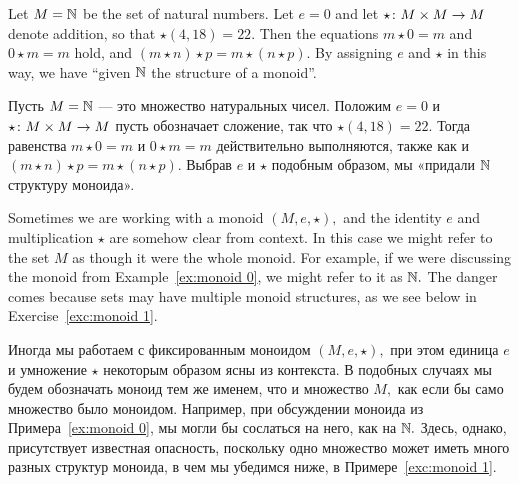 \documentclass[CT4S-EN-RU]{subfiles}
\begin{document}
\begin{exampleENG}\label{ex:monoid 0}
Let $M={\mathbb N}$ be the set of natural numbers. Let $e=0$ and let $\star\colon M\times M\rightarrow M$ denote addition, so that $\star(4,18)=22.$ Then the equations $m\star 0=m$ and $0\star m=m$ hold, and $(m\star n)\star p=m\star (n\star p).$ By assigning $e$ and $\star$ in this way, we have “given ${\mathbb N}$ the structure of a monoid”.
\end{exampleENG}

\begin{exampleRUS}\label{ex:monoid 0}
Пусть $M={\mathbb N}$ — это множество натуральных чисел. Положим $e=0$ и $\star\colon M\times M\rightarrow M$ пусть обозначает сложение, так что $\star(4,18)=22.$ Тогда равенства $m\star 0=m$ и $0\star m=m$ действительно выполняются, также как и $(m\star n)\star p=m\star (n\star p).$ Выбрав $e$ и $\star$ подобным образом, мы «придали ${\mathbb N}$ структуру моноида».
\end{exampleRUS}

\begin{remarkENG}
Sometimes we are working with a monoid $(M,e,\star),$ and the identity $e$ and multiplication $\star$ are somehow clear from context. In this case we might refer to the set $M$ as though it were the whole monoid. For example, if we were discussing the monoid from Example~\ref{ex:monoid 0}, we might refer to it as ${\mathbb N}.$ The danger comes because sets may have multiple monoid structures, as we see below in Exercise~\ref{exc:monoid 1}.
\end{remarkENG}

\begin{remarkRUS}
Иногда мы работаем с фиксированным моноидом $(M,e,\star),$ при этом единица $e$ и умножение $\star$ некоторым образом ясны из контекста. В подобных случаях мы будем обозначать моноид тем же именем, что и множество $M,$ как если бы само множество было моноидом. Например, при обсуждении моноида из Примера~\ref{ex:monoid 0}, мы могли бы сослаться на него, как на ${\mathbb N}.$ Здесь, однако, присутствует известная опасность, поскольку одно множество может иметь много разных структур моноида, в чем мы убедимся ниже, в Примере~\ref{exc:monoid 1}.
\end{remarkRUS}
\end{document}
